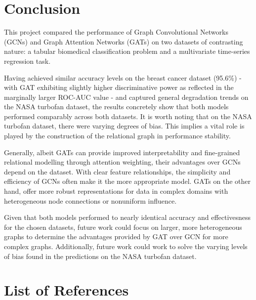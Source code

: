 \documentclass[12pt]{article}
\begin{document}
\pagebreak
\section{Conclusion}
This project compared the performance of Graph Convolutional Networks (GCNs) and Graph Attention Networks (GATs) on two datasets of contrasting nature: a tabular biomedical classification problem and a multivariate time-series regression task. 

Having achieved similar accuracy levels on the breast cancer dataset (95.6\%) - with GAT exhibiting slightly higher discriminative power as reflected in the marginally larger ROC-AUC value - and captured general degradation trends on the NASA turbofan dataset, the results concretely show that both models performed comparably across both datasets. 
It is worth noting that on the NASA turbofan dataset, there were varying degrees of bias. This implies a vital role is played by the construction of the relational graph in performance stability.

Generally, albeit GATs can provide improved interpretability and fine-grained relational modelling through attention weighting, their advantages over GCNs depend on the dataset. 
With clear feature relationships, the simplicity and efficiency of GCNs often make it the more appropriate model. 
GATs on the other hand, offer more robust representations for data in complex domains with heterogeneous node connections or nonuniform influence.

Given that both models performed to nearly identical accuracy and effectivesness for the chosen datasets, 
future work could focus on larger, more heterogeneous graphs to determine the advantages provided by GAT over GCN for more complex graphs.
Additionally, future work could work to solve the varying levels of bias found in the predictions on the NASA turbofan dataset.

\pagebreak
\section*{List of References}
\renewcommand{\thepage}{R-\arabic{page}}
\printbibliography[heading=none]

\end{document}

